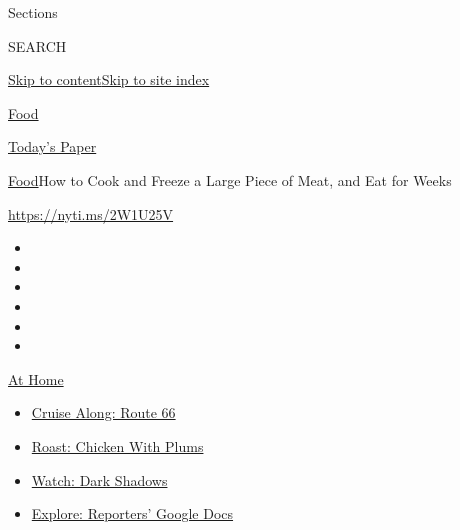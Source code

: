 Sections

SEARCH

\protect\hyperlink{site-content}{Skip to
content}\protect\hyperlink{site-index}{Skip to site index}

\href{https://www.nytimes3xbfgragh.onion/section/food}{Food}

\href{https://myaccount.nytimes3xbfgragh.onion/auth/login?response_type=cookie\&client_id=vi}{}

\href{https://www.nytimes3xbfgragh.onion/section/todayspaper}{Today's
Paper}

\href{/section/food}{Food}\textbar{}How to Cook and Freeze a Large Piece
of Meat, and Eat for Weeks

\url{https://nyti.ms/2W1U25V}

\begin{itemize}
\item
\item
\item
\item
\item
\item
\end{itemize}

\href{https://www.nytimes3xbfgragh.onion/spotlight/at-home?action=click\&pgtype=Article\&state=default\&region=TOP_BANNER\&context=at_home_menu}{At
Home}

\begin{itemize}
\tightlist
\item
  \href{https://www.nytimes3xbfgragh.onion/2020/09/07/travel/route-66.html?action=click\&pgtype=Article\&state=default\&region=TOP_BANNER\&context=at_home_menu}{Cruise
  Along: Route 66}
\item
  \href{https://www.nytimes3xbfgragh.onion/2020/09/04/dining/sheet-pan-chicken.html?action=click\&pgtype=Article\&state=default\&region=TOP_BANNER\&context=at_home_menu}{Roast:
  Chicken With Plums}
\item
  \href{https://www.nytimes3xbfgragh.onion/2020/09/04/arts/television/dark-shadows-stream.html?action=click\&pgtype=Article\&state=default\&region=TOP_BANNER\&context=at_home_menu}{Watch:
  Dark Shadows}
\item
  \href{https://www.nytimes3xbfgragh.onion/interactive/2020/at-home/even-more-reporters-editors-diaries-lists-recommendations.html?action=click\&pgtype=Article\&state=default\&region=TOP_BANNER\&context=at_home_menu}{Explore:
  Reporters' Google Docs}
\end{itemize}


